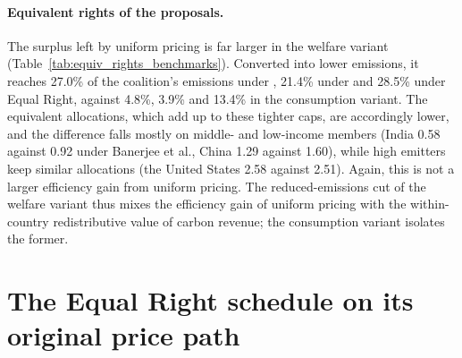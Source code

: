 \documentclass[12pt,english]{article}
\theoremstyle{remark}
\begin{document}
\paragraph{Equivalent rights of the proposals.} The surplus left by uniform pricing is far larger in the welfare variant (Table~\ref{tab:equiv_rights_benchmarks}). Converted into lower emissions, it reaches 27.0\% of the coalition's emissions under \citet{wolfram_building_2025}, 21.4\% under \citet{banerjee_grand_2025} and 28.5\% under Equal Right, against 4.8\%, 3.9\% and 13.4\% in the consumption variant. The equivalent allocations, which add up to these tighter caps, are accordingly lower, and the difference falls mostly on middle- and low-income members (India 0.58 against 0.92 under Banerjee et al., China 1.29 against 1.60), while high emitters keep similar allocations (the United States 2.58 against 2.51). Again, this is not a larger efficiency gain from uniform pricing. %
The reduced-emissions cut of the welfare variant thus mixes the efficiency gain of uniform pricing with the within-country redistributive value of carbon revenue; the consumption variant isolates the former. %


\clearpage
\section{The Equal Right schedule on its original price path}
\label{app:ede}
\end{document}
